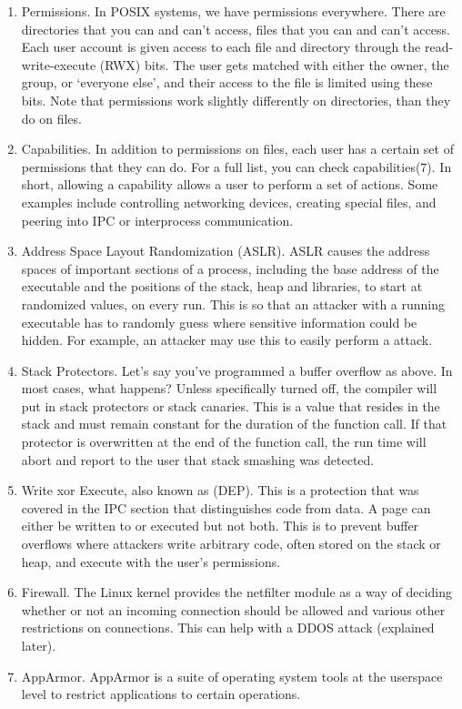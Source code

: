 \begin{enumerate}
\item Permissions.
  In POSIX systems, we have permissions everywhere.
  There are directories that you can and can't access, files that you can and can't access.
  Each user account is given access to each file and directory through the read-write-execute (RWX) bits.
  The user gets matched with either the owner, the group, or `everyone else', and their access to the file is limited using these bits.
  Note that permissions work slightly differently on directories, than they do on files.
\item Capabilities.
  In addition to permissions on files, each user has a certain set of permissions that they can do.
  For a full list, you can check capabilities(7).
  In short, allowing a capability allows a user to perform a set of actions.
  Some examples include controlling networking devices, creating special files, and peering into IPC or interprocess communication.
\item Address Space Layout Randomization (ASLR).
  ASLR causes the address spaces of important sections of a process, including the base address of the executable and the positions of the stack, heap and libraries, to start at randomized values, on every run.
  This is so that an attacker with a running executable has to randomly guess where sensitive information could be hidden.
  For example, an attacker may use this to easily perform a  attack.
\item Stack Protectors.
  Let's say you've programmed a buffer overflow as above.
  In most cases, what happens?
  Unless specifically turned off, the compiler will put in stack protectors or stack canaries. This is a value that resides in the stack and must remain constant for the duration of the function call. If that protector is overwritten at the end of the function call, the run time will abort and report to the user that stack smashing was detected.
\item Write xor Execute, also known as  (DEP).
  This is a protection that was covered in the IPC section that distinguishes code from data.
  A page can either be written to or executed but not both.
  This is to prevent buffer overflows where attackers write arbitrary code, often stored on the stack or heap, and execute with the user's permissions.
\item Firewall.
  The Linux kernel provides the netfilter module as a way of deciding whether or not an incoming connection should be allowed and various other restrictions on connections.
  This can help with a DDOS attack (explained later).
\item AppArmor.
  AppArmor is a suite of operating system tools at the userspace level to restrict applications to certain operations.
\end{enumerate}

